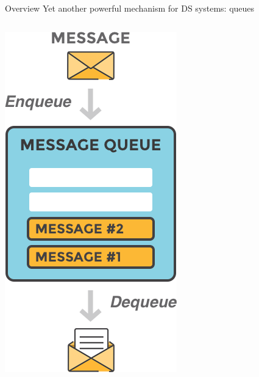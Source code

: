 \documentclass{beamer}\mode<presentation>{\usetheme{AMSBolognaFC}}
\begin{document}
\begin{frame}{Overview}
    Yet another powerful mechanism for DS systems: \alert{queues}
    \begin{columns}
        \begin{column}{.26\linewidth}
            \begin{center}
                \includegraphics[width=\linewidth]{img/queue.png}

\end{center}
\end{column}
\end{columns}
\end{frame}
\end{document}
